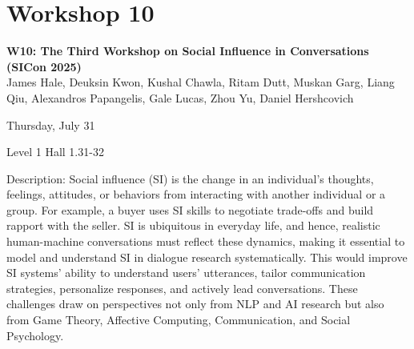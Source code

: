 \clearpage


\section[W10: The Third Workshop on Social Influence in Conversations (SICon 2025)]{Workshop 10}
\label{workshop_10}

\begin{center}
    {\Large \textbf{W10: The Third Workshop on Social Influence in Conversations (SICon 2025)}}\\
    

    James Hale, Deuksin Kwon, Kushal Chawla, Ritam Dutt, Muskan Garg, Liang Qiu, Alexandros Papangelis, Gale Lucas, Zhou Yu, Daniel Hershcovich

   Thursday, July 31
    
    Level 1 Hall 1.31-32

\end{center}
	
Description: Social influence (SI) is the change in an individual's thoughts, feelings, attitudes, or behaviors from interacting with another individual or a group. For example, a buyer uses SI skills to negotiate trade-offs and build rapport with the seller. SI is ubiquitous in everyday life, and hence, realistic human-machine conversations must reflect these dynamics, making it essential to model and understand SI in dialogue research systematically. This would improve SI systems' ability to understand users’ utterances, tailor communication strategies, personalize responses, and actively lead conversations. These challenges draw on perspectives not only from NLP and AI research but also from Game Theory, Affective Computing, Communication, and Social Psychology.


